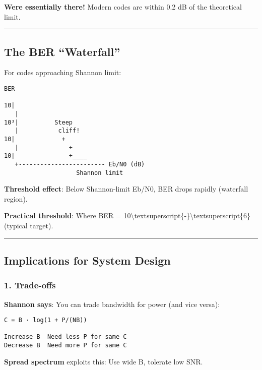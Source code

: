 \textbf{We\textquotesingle re essentially there!} Modern codes are
within 0.2 dB of the theoretical limit.

\begin{center}\rule{0.5\linewidth}{0.5pt}\end{center}

\subsection{\texorpdfstring{ The BER
``Waterfall''}{ The BER ``Waterfall''}}\label{the-ber-waterfall}

For codes approaching Shannon limit:

\begin{verbatim}
BER
 
10|
   |
10³|          Steep
   |           cliff!
10|             +
   |              +
10|               +____
   +------------------------ Eb/N0 (dB)
                    Shannon limit
\end{verbatim}

\textbf{Threshold effect}: Below Shannon-limit Eb/N0, BER drops rapidly
(waterfall region).

\textbf{Practical threshold}: Where BER =
10\textbackslash textsuperscript\{-\}\textbackslash textsuperscript\{6\}
(typical target).

\begin{center}\rule{0.5\linewidth}{0.5pt}\end{center}

\subsection{\texorpdfstring{ Implications for System
Design}{ Implications for System Design}}\label{implications-for-system-design}

\subsubsection{1. Trade-offs}\label{trade-offs}

\textbf{Shannon says}: You can trade bandwidth for power (and vice
versa):

\begin{verbatim}
C = B · log(1 + P/(NB))

Increase B  Need less P for same C
Decrease B  Need more P for same C
\end{verbatim}

\textbf{Spread spectrum} exploits this: Use wide B, tolerate low SNR.

